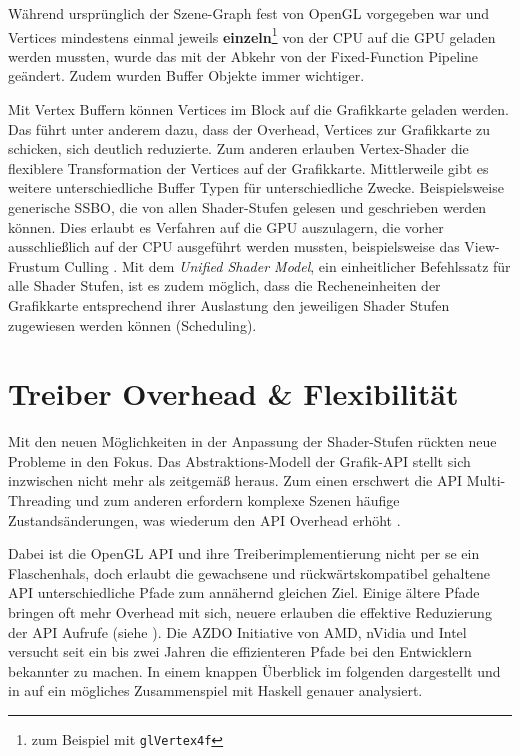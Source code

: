 Während ursprünglich der Szene-Graph fest von OpenGL vorgegeben war und Vertices mindestens einmal jeweils \textbf{einzeln}\footnote{ zum Beispiel mit \texttt{glVertex4f}} von der CPU auf die GPU geladen werden mussten, wurde das mit der Abkehr von der Fixed-Function Pipeline geändert. Zudem wurden Buffer Objekte immer wichtiger.

Mit Vertex Buffern können Vertices im Block auf die Grafikkarte geladen werden. Das führt unter anderem dazu, dass der Overhead, Vertices zur Grafikkarte zu schicken, sich deutlich reduzierte. Zum anderen erlauben Vertex-Shader die flexiblere Transformation der Vertices auf der Grafikkarte. Mittlerweile gibt es weitere unterschiedliche Buffer Typen für unterschiedliche Zwecke. Beispielsweise generische \acf{SSBO}, die von allen Shader-Stufen gelesen und geschrieben werden können. Dies erlaubt es Verfahren auf die GPU auszulagern, die vorher ausschließlich auf der CPU ausgeführt werden mussten, beispielsweise das View-Frustum Culling \parencite{Barczak2008}. Mit dem \textit{Unified Shader Model}, ein einheitlicher Befehlssatz für alle Shader Stufen, ist es zudem möglich, dass die Recheneinheiten der Grafikkarte entsprechend ihrer Auslastung den jeweiligen Shader Stufen zugewiesen werden können (Scheduling).

\section{Treiber Overhead \& Flexibilität}
\label{sec:overhead-und-flexibilitaet}

Mit den neuen Möglichkeiten in der Anpassung der Shader-Stufen rückten neue Probleme in den Fokus. Das Abstraktions-Modell der Grafik-\ac{API} stellt sich inzwischen nicht mehr als zeitgemäß heraus. Zum einen erschwert die \ac{API} Multi-Threading und zum anderen erfordern komplexe Szenen häufige Zustandsänderungen, was wiederum den \ac{API} Overhead erhöht \parencite[Seite 8]{Everitt2014a}.

Dabei ist die OpenGL API und ihre Treiberimplementierung nicht per se ein Flaschenhals, doch erlaubt die gewachsene und rückwärtskompatibel gehaltene API unterschiedliche Pfade zum annähernd gleichen Ziel. Einige ältere Pfade bringen oft mehr Overhead mit sich, neuere erlauben die effektive Reduzierung der API Aufrufe (siehe ). Die \ac{AZDO} Initiative von AMD, nVidia und Intel versucht seit ein bis zwei Jahren die effizienteren Pfade bei den Entwicklern bekannter zu machen. In einem knappen Überblick im folgenden dargestellt und in  auf ein mögliches Zusammenspiel mit Haskell genauer analysiert.

